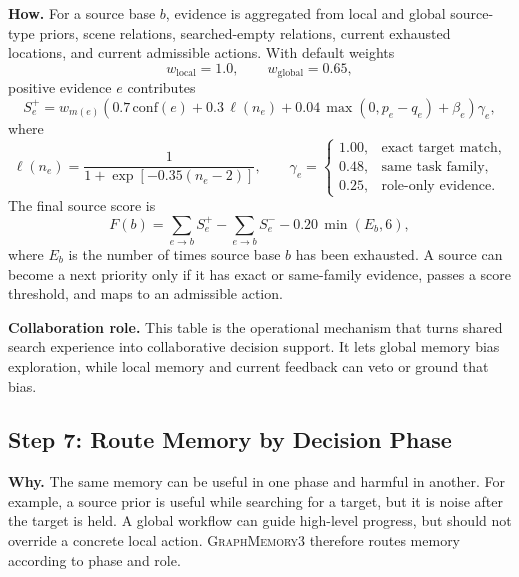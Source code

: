 \documentclass[11pt]{article}
\newcommand{\modelname}{\textsc{GraphMemory3}\xspace}
\begin{document}
\textbf{How.} For a source base $b$, evidence is aggregated from local and global
source-type priors, scene relations, searched-empty relations, current exhausted
locations, and current admissible actions. With default weights
\begin{equation}
    w_{\mathrm{local}}=1.0,
    \qquad
    w_{\mathrm{global}}=0.65,
\end{equation}
positive evidence $e$ contributes
\begin{equation}
    S^+_e =
    w_{m(e)}
    \left(
    0.7\,\mathrm{conf}(e)
    + 0.3\,\ell(n_e)
    + 0.04\,\max(0,p_e-q_e)
    + \beta_e
    \right)
    \gamma_e ,
\end{equation}
where
\begin{equation}
    \ell(n_e)=\frac{1}{1+\exp[-0.35(n_e-2)]},
    \qquad
    \gamma_e =
    \begin{cases}
    1.00, & \text{exact target match},\\
    0.48, & \text{same task family},\\
    0.25, & \text{role-only evidence}.
    \end{cases}
\end{equation}
The final source score is
\begin{equation}
    F(b)=
    \sum_{e\rightarrow b} S^+_e
    -
    \sum_{e\rightarrow b} S^-_e
    -
    0.20\,\min(E_b,6),
\end{equation}
where $E_b$ is the number of times source base $b$ has been exhausted. A source
can become a next priority only if it has exact or same-family evidence, passes a
score threshold, and maps to an admissible action.

\textbf{Collaboration role.} This table is the operational mechanism that turns
shared search experience into collaborative decision support. It lets global
memory bias exploration, while local memory and current feedback can veto or
ground that bias.

\subsection{Step 7: Route Memory by Decision Phase}

\textbf{Why.} The same memory can be useful in one phase and harmful in another.
For example, a source prior is useful while searching for a target, but it is
noise after the target is held. A global workflow can guide high-level progress,
but should not override a concrete local action. \modelname therefore routes
memory according to phase and role.
\end{document}

